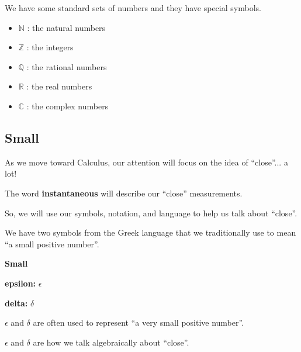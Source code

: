 \documentclass{ximera}
\begin{document}
We have some standard sets of numbers and they have special symbols. 



\begin{itemize}

\item $\mathbb{N}$ : the natural numbers
\item $\mathbb{Z}$ : the integers
\item $\mathbb{Q}$ : the rational numbers
\item $\mathbb{R}$ : the real numbers
\item $\mathbb{C}$ : the complex numbers
\end{itemize}

















\subsection*{Small}



As we move toward Calculus, our attention will focus on the idea of  ``close''... a lot! 


The word \textbf{instantaneous} will describe our ``close'' measurements. 


So, we will use our symbols, notation, and language to help us talk about ``close''. 


We have two symbols from the Greek language that we traditionally use to mean ``a small positive number''. 



\begin{notation} \textbf{\textcolor{red!50!green}{Small}} 


\textbf{\textcolor{red!50!green}{epsilon:}}  $\epsilon$ 

\textbf{\textcolor{red!50!green}{delta:}}  $\delta$ 


\end{notation}

$\epsilon$ and $\delta$ are often used to represent ``a very small positive number''.   


$\epsilon$ and $\delta$ are how we talk algebraically about ``close''. 
\end{document}

